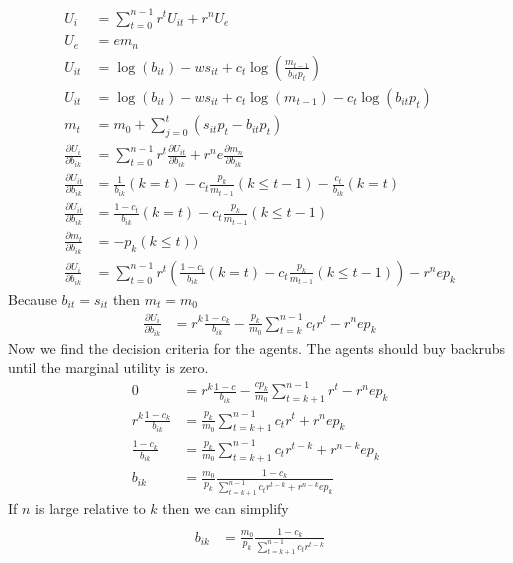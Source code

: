 \documentclass[14pt]{article} \usepackage{amsmath}
\begin{document}
\begin{align} 
	U_i &= \sum\limits_{t=0}^{n-1} r^t U_{it} + r^n U_e
	\\U_e &=  e m_n 
	\\U_{it} &= \log(b_{it}) - w s_{it} + c_t \log(\frac{m_{t-1}}{b_{it} p_t})
	\\ U_{it} &= \log(b_{it}) - w s_{it} + c_t \log(m_{t-1}) - c_t \log(b_{it} p_t)
	\\ m_t &= m_0 + \sum\limits_{j=0}^t (s_{it} p_t -b_{it} p_t)
	\\\frac{ \partial U_i}{\partial b_{ik}} &= \sum\limits_{t=0}^{n-1} r^t \frac{\partial U_{it}}{\partial b_{ik}} + r^n e \frac{\partial m_n}{\partial b_{ik}} 
	\\\frac{\partial U_{it}}{\partial b_{ik}} &= \frac{1}{b_{ik}} (k = t)-c_t \frac{p_k}{m_{t-1}} (k \leq t-1) - \frac{c_t}{b_{ik}} (k = t) 
	\\\frac{\partial U_{it}}{\partial b_{ik}} &= \frac{1-c_t}{b_{ik}} (k = t)-c_t\frac{p_k}{m_{t-1}} (k \leq t-1) 
	\\\frac{\partial m_t}{\partial b_{ik}} &= -p_k(k \leq t)) 
	\\\frac{\partial U_i}{\partial b_{ik}} &= \sum\limits_{t=0}^{n-1} r^t(\frac{1-c_t}{b_{ik}} (k = t)-c_t\frac{p_k}{m_{t-1}} (k \leq t-1)) - r^n e p_k 
\end{align}
Because $b_{it} = s_{it}$ then $m_t = m_0$ 
\begin{align}
	\frac{\partial U_i}{\partial b_{ik}} &= r^k\frac{1-c_k}{b_{ik}} - \frac{p_k}{m_0} \sum\limits_{t=k}^{n-1} c_t r^t - r^n e p_k
\end{align}
Now we find the decision criteria for the agents. The agents should buy backrubs until the marginal utility is zero.
\begin{align}
 	0 &= r^k\frac{1-c}{b_{ik}} - \frac{c p_k}{m_0} \sum\limits_{t=k+1}^{n-1} r^t - r^n e p_k 
 	\\r^k\frac{1-c_k}{b_{ik}} &=  \frac{p_k}{m_0} \sum\limits_{t=k+1}^{n-1} c_t r^t + r^n e p_k 
 	\\\frac{1-c_k}{b_{ik}} &=  \frac{p_k}{m_0} \sum\limits_{t=k+1}^{n-1} c_t r^{t-k} + r^{n-k} e p_k 
 	\\b_{ik} &=  \frac{m_0}{p_k} \frac {1-c_k}{\sum\limits_{t=k+1}^{n-1} c_t r^{t-k} + r^{n-k} e p_k} 
\end{align}
If $n$ is large relative to $k$ then we can simplify 
\begin{align}
 	\\b_{ik} &=  \frac{m_0}{p_k} \frac {1-c_k}{\sum\limits_{t=k+1}^{n-1} c_t r^{t-k}} 
\end{align}
\end{document}
